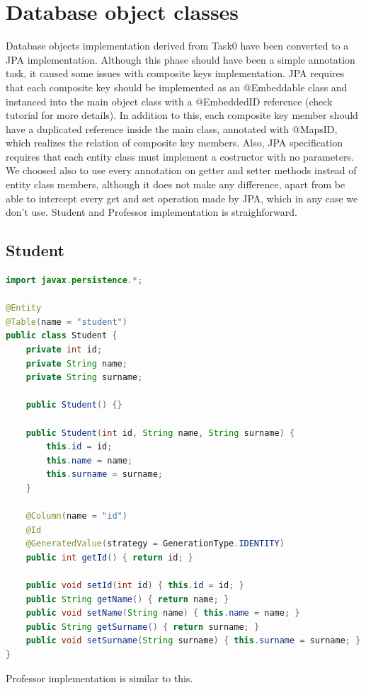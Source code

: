 \documentclass{report}
\begin{document}
\section*{Database object classes}
Database objects implementation derived from Task0 have been converted to a JPA implementation. Although this phase should have been a simple annotation task, it caused some issues with composite keys implementation. JPA requires that each composite key should be implemented as an @Embeddable class and instanced into the main object class with a @EmbeddedID reference (check tutorial for more details). In addition to this, each composite key member should have a duplicated reference inside the main class, annotated with @MapsID, which realizes the relation of composite key members. Also, JPA specification requires that each entity class must implement a costructor with no parameters. We choosed also to use every annotation on getter and setter methods instead of entity class members, although it does not make any difference, apart from be able to intercept every get and set operation made by JPA, which in any case we don't use. Student and Professor implementation is straighforward.

\subsection*{Student}
\begin{lstlisting}[language=Java]
import javax.persistence.*;

@Entity
@Table(name = "student")
public class Student {
	private int id;
	private String name;
	private String surname;

	public Student() {}

	public Student(int id, String name, String surname) {
		this.id = id;
		this.name = name;
		this.surname = surname;
	}

	@Column(name = "id")
	@Id
	@GeneratedValue(strategy = GenerationType.IDENTITY)
	public int getId() { return id; }

	public void setId(int id) { this.id = id; }
	public String getName() { return name; }
	public void setName(String name) { this.name = name; }
	public String getSurname() { return surname; }
	public void setSurname(String surname) { this.surname = surname; }
}
\end{lstlisting}
Professor implementation is similar to this.
\end{document}
